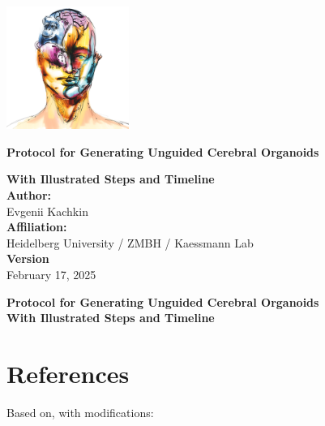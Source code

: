 \documentclass[11pt]{article}
\begin{document}
\begin{titlepage} %
    \centering

    \includegraphics[width=0.3\textwidth]{logo_400x400.png}\vspace{1cm}

    {\Huge \textbf{Protocol for Generating Unguided Cerebral Organoids}\\[1cm]}

    {\Large \textbf{With Illustrated Steps and Timeline}}\\[1cm]

    \textbf{Author:}\\
    Evgenii Kachkin\\[0.5cm]

    \textbf{Affiliation:}\\
    Heidelberg University / ZMBH / Kaessmann Lab\\[0.5cm]

    \textbf{Version}\\
    February 17, 2025

    \vspace{\fill} %
\end{titlepage}

\begin{center}
{\Large \textbf{Protocol for Generating Unguided Cerebral Organoids}}\\[0.5em]
\textbf{With Illustrated Steps and Timeline}\\[1em]
\end{center}

\tableofcontents
\listoftables
\listoffigures
\clearpage 

\section{References}
Based on, with modifications:
\end{document}
